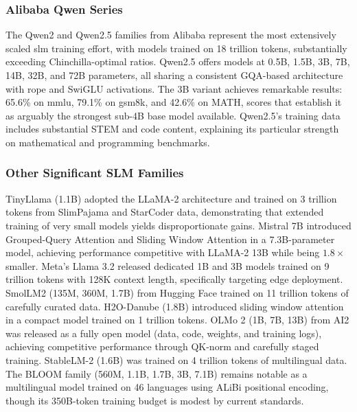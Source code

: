 \subsubsection{Alibaba Qwen Series}
\label{subsubsec:qwen_series}
The Qwen2 \citep{yang2024qwen2} and Qwen2.5 \citep{qwen2024qwen25} families from Alibaba represent the most extensively scaled \gls{slm} training effort, with models trained on 18 trillion tokens, substantially exceeding Chinchilla-optimal ratios. Qwen2.5 offers models at 0.5B, 1.5B, 3B, 7B, 14B, 32B, and 72B parameters, all sharing a consistent GQA-based architecture with \gls{rope} and SwiGLU activations. The 3B variant achieves remarkable results: 65.6\% on \gls{mmlu}, 79.1\% on \gls{gsm8k}, and 42.6\% on MATH, scores that establish it as arguably the strongest sub-4B base model available. Qwen2.5's training data includes substantial STEM and code content, explaining its particular strength on mathematical and programming benchmarks.

\subsubsection{Other Significant SLM Families}
\label{subsubsec:other_slm_families}
TinyLlama (1.1B) \citep{zhang2024tinyllama} adopted the LLaMA-2 architecture and trained on 3 trillion tokens from SlimPajama and StarCoder data, demonstrating that extended training of very small models yields disproportionate gains. Mistral 7B \citep{jiang2023mistral} introduced Grouped-Query Attention and Sliding Window Attention in a 7.3B-parameter model, achieving performance competitive with LLaMA-2 13B while being $1.8\times$ smaller. Meta's Llama 3.2 \citep{grattafiori2024llama3} released dedicated 1B and 3B models trained on 9 trillion tokens with 128K context length, specifically targeting edge deployment. SmolLM2 (135M, 360M, 1.7B) \citep{allal2025smollm2} from Hugging Face trained on 11 trillion tokens of carefully curated data. H2O-Danube (1.8B) \citep{singer2024h2odanube} introduced sliding window attention in a compact model trained on 1 trillion tokens. OLMo 2 (1B, 7B, 13B) \citep{olmo2025} from AI2 was released as a fully open model (data, code, weights, and training logs), achieving competitive performance through QK-norm and carefully staged training. StableLM-2 (1.6B) \citep{stabilityai2024stablelm} was trained on 4 trillion tokens of multilingual data. The BLOOM family (560M, 1.1B, 1.7B, 3B, 7.1B) \citep{bloom2022} remains notable as a multilingual model trained on 46 languages using ALiBi positional encoding, though its 350B-token training budget is modest by current standards.


